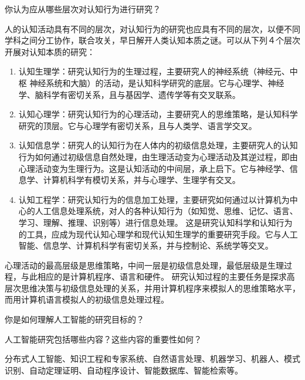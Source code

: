 \begin{question}
你认为应从哪些层次对认知行为进行研究？
\end{question}
\begin{solution}
人的认知活动具有不同的层次，对认知行为的研究也应具有不同的层次，以便不同学科之间分工协作，联合攻关，早日解开人类认知本质之谜。可以从下列４个层次开展对认知本质的研究： 
	\begin{enumerate}
		\item 认知生理学：研究认知行为的生理过程，主要研究人的神经系统（神经元、中枢 神经系统和大脑）的活动，是认知科学研究的底层。它与心理学、神经学、脑科学有密切关系，且与基因学、遗传学等有交叉联系。
		\item 认知心理学：研究认知行为的心理活动，主要研究人的思维策略，是认知科学研究的顶层。它与心理学有密切关系，且与人类学、语言学交叉。
		\item 认知信息学：研究人的认知行为在人体内的初级信息处理，主要研究人的认知行为如何通过初级信息自然处理，由生理活动变为心理活动及其逆过程，即由心理活动变为生理行为。这是认知活动的中间层，承上启下。它与神经学、信息学、计算机科学有模切关系，并与心理学、生理学有交叉。
		\item 认知工程学：研究认知行为的信息加工处理，主要研究如何通过以计算机为中心的人工信息处理系统，对人的各种认知行为（如知觉、思维、记忆、语言、学习、理解、推理、识别等）进行信息处理。 这是研究认知科学和认知行为的工具，应成为现代认知心理学和现代认知生理学的重要研究手段。它与人工智能、信息学、计算机科学有密切关系，并与控制论、系统学等交叉。
	\end{enumerate} \par
心理活动的最高层级是思维策略，中间一层是初级信息处理，最低层级是生理过程，与此相应的是计算机程序、语言和硬件。 研究认知过程的主要任务是探求高层次思维决策与初级信息处理的关系，并用计算机程序来模拟人的思维策略水平，而用计算机语言模拟人的初级信息处理过程。 
\end{solution}

\begin{question}
你是如何理解人工智能的研究目标的？
\end{question}
\begin{solution}
\end{solution}

\begin{question}
人工智能研究包括哪些内容？这些内容的重要性如何？
\end{question}
\begin{solution}
分布式人工智能、知识工程和专家系统、自然语言处理、机器学习、机器人、模式识别、自动定理证明、自动程序设计、智能数据库、智能检索等。
\end{solution}

